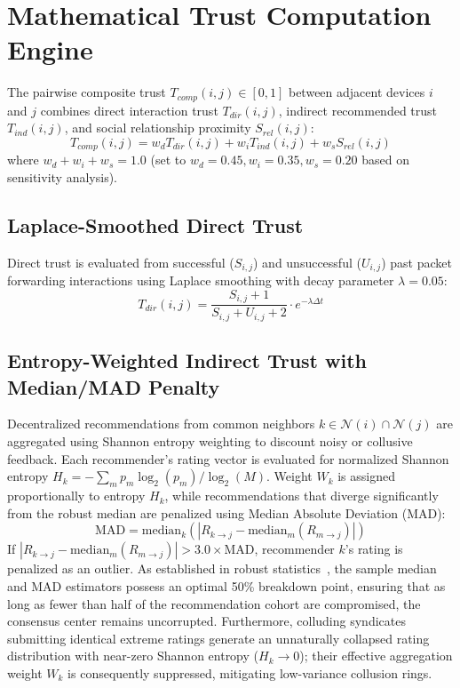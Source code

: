 \documentclass[journal,compsoc]{IEEEtran}
\begin{document}
\section{Mathematical Trust Computation Engine}
The pairwise composite trust $T_{comp}(i,j) \in [0, 1]$ between adjacent devices $i$ and $j$ combines direct interaction trust $T_{dir}(i,j)$, indirect recommended trust $T_{ind}(i,j)$, and social relationship proximity $S_{rel}(i,j)$:
\begin{equation}
T_{comp}(i,j) = w_d T_{dir}(i,j) + w_i T_{ind}(i,j) + w_s S_{rel}(i,j)
\end{equation}
where $w_d + w_i + w_s = 1.0$ (set to $w_d = 0.45, w_i = 0.35, w_s = 0.20$ based on sensitivity analysis).

\subsection{Laplace-Smoothed Direct Trust}
Direct trust is evaluated from successful ($S_{i,j}$) and unsuccessful ($U_{i,j}$) past packet forwarding interactions using Laplace smoothing with decay parameter $\lambda = 0.05$:
\begin{equation}
T_{dir}(i,j) = \frac{S_{i,j} + 1}{S_{i,j} + U_{i,j} + 2} \cdot e^{-\lambda \Delta t}
\end{equation}

\subsection{Entropy-Weighted Indirect Trust with Median/MAD Penalty}
Decentralized recommendations from common neighbors $k \in \mathcal{N}(i) \cap \mathcal{N}(j)$ are aggregated using Shannon entropy weighting to discount noisy or collusive feedback. Each recommender's rating vector is evaluated for normalized Shannon entropy $H_k = -\sum_{m} p_m \log_2(p_m) / \log_2(M)$. Weight $W_k$ is assigned proportionally to entropy $H_k$, while recommendations that diverge significantly from the robust median are penalized using Median Absolute Deviation (MAD):
\begin{equation}
\text{MAD} = \text{median}_k \left( |R_{k \to j} - \text{median}_m(R_{m \to j})| \right)
\end{equation}
If $|R_{k \to j} - \text{median}_m(R_{m \to j})| > 3.0 \times \text{MAD}$, recommender $k$'s rating is penalized as an outlier. As established in robust statistics~\cite{rousseeuw2020statistical, ahangaran2024dreamer}, the sample median and MAD estimators possess an optimal 50\% breakdown point, ensuring that as long as fewer than half of the recommendation cohort are compromised, the consensus center remains uncorrupted. Furthermore, colluding syndicates submitting identical extreme ratings generate an unnaturally collapsed rating distribution with near-zero Shannon entropy ($H_k \to 0$); their effective aggregation weight $W_k$ is consequently suppressed, mitigating low-variance collusion rings.
\end{document}
